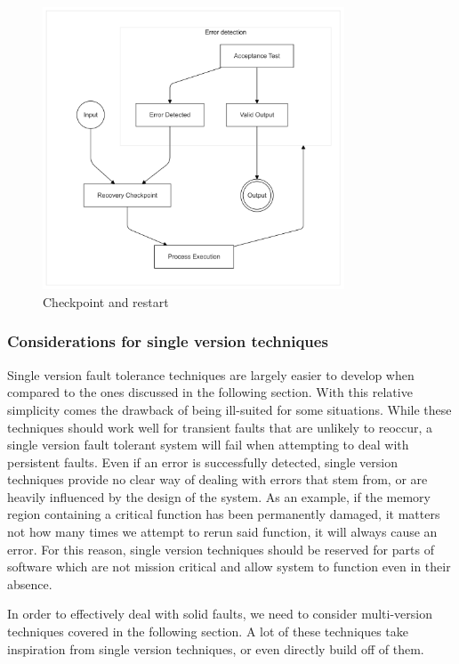 \documentclass[12pt, letterpaper]{article}
\begin{document}
\begin{figure}[hbt]
    \centering
    \includegraphics[width=0.8\textwidth]{diagrams/checkpoint/checkpoint.png}
    \caption{Checkpoint and restart}
    \label{fig:checkpoint}
\end{figure}

\subsubsection{Considerations for single version techniques}

Single version fault tolerance techniques are largely easier to develop when compared to the ones discussed in the following section. With this relative simplicity comes the drawback of being ill-suited for some situations. While these techniques should work well for transient faults that are unlikely to reoccur, a single version fault tolerant system will fail when attempting to deal with persistent faults. Even if an error is successfully detected, single version techniques provide no clear way of dealing with errors that stem from, or are heavily influenced by the design of the system. As an example, if the memory region containing a critical function has been permanently damaged, it matters not how many times we attempt to rerun said function, it will always cause an error. For this reason, single version techniques should be reserved for parts of software which are not mission critical and allow system to function even in their absence.

In order to effectively deal with solid faults, we need to consider multi-version techniques covered in the following section. A lot of these techniques take inspiration from single version techniques, or even directly build off of them.
\end{document}
